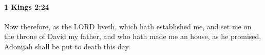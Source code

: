 
		\paragraph{1 Kings 2:24} %
			\label{1KINGS-2-24}

			Now therefore, as the LORD liveth, which hath established me, and set me on the throne of David my father, and who hath made me an house, as he promised, Adonijah shall be put to death this day.


